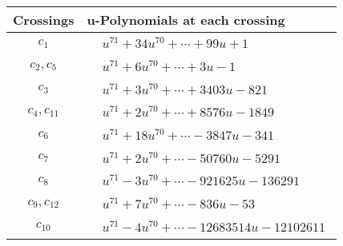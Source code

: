 \documentclass[1p]{elsarticle_modified}
\theoremstyle{definition}
\begin{document}
\begin{tabular}{m{50pt}|m{274pt}}
Crossings & \hspace{64pt}u-Polynomials at each crossing \\
\hline $$\begin{aligned}c_{1}\end{aligned}$$&$\begin{aligned}
&u^{71}+34 u^{70}+\cdots+99 u+1
\end{aligned}$\\
\hline $$\begin{aligned}c_{2},c_{5}\end{aligned}$$&$\begin{aligned}
&u^{71}+6 u^{70}+\cdots+3 u-1
\end{aligned}$\\
\hline $$\begin{aligned}c_{3}\end{aligned}$$&$\begin{aligned}
&u^{71}+3 u^{70}+\cdots+3403 u-821
\end{aligned}$\\
\hline $$\begin{aligned}c_{4},c_{11}\end{aligned}$$&$\begin{aligned}
&u^{71}+2 u^{70}+\cdots+8576 u-1849
\end{aligned}$\\
\hline $$\begin{aligned}c_{6}\end{aligned}$$&$\begin{aligned}
&u^{71}+18 u^{70}+\cdots-3847 u-341
\end{aligned}$\\
\hline $$\begin{aligned}c_{7}\end{aligned}$$&$\begin{aligned}
&u^{71}+2 u^{70}+\cdots-50760 u-5291
\end{aligned}$\\
\hline $$\begin{aligned}c_{8}\end{aligned}$$&$\begin{aligned}
&u^{71}-3 u^{70}+\cdots-921625 u-136291
\end{aligned}$\\
\hline $$\begin{aligned}c_{9},c_{12}\end{aligned}$$&$\begin{aligned}
&u^{71}+7 u^{70}+\cdots-836 u-53
\end{aligned}$\\
\hline $$\begin{aligned}c_{10}\end{aligned}$$&$\begin{aligned}
&u^{71}-4 u^{70}+\cdots-12683514 u-12102611
\end{aligned}$\\
\hline
\end{tabular}\\~\\
\end{document}
